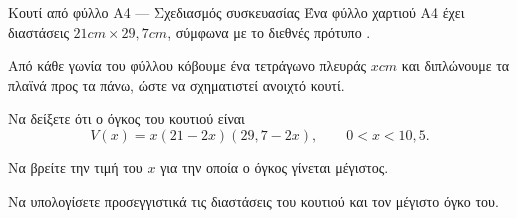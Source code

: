 \begin{problhma}{Κουτί από φύλλο Α4 --- Σχεδιασμός συσκευασίας}
Ένα φύλλο χαρτιού Α4 έχει διαστάσεις \(21\si{cm}\times29{,}7\si{cm}\),
σύμφωνα με το διεθνές πρότυπο  \cite{iso216PaperSizes}.

Από κάθε γωνία του φύλλου κόβουμε ένα τετράγωνο πλευράς \(x\si{cm}\)
και διπλώνουμε τα πλαϊνά προς τα πάνω, ώστε να σχηματιστεί ανοιχτό
κουτί.
\begin{alist}
  \item Να δείξετε ότι ο όγκος του κουτιού είναι
        \[
          V(x)=x(21-2x)(29{,}7-2x),
          \qquad 0<x<10{,}5.
        \]
  \item Να βρείτε την τιμή του \(x\) για την οποία ο όγκος γίνεται
        μέγιστος.
  \item Να υπολογίσετε προσεγγιστικά τις διαστάσεις του κουτιού και
        τον μέγιστο όγκο του.
\end{alist}
\end{problhma}

